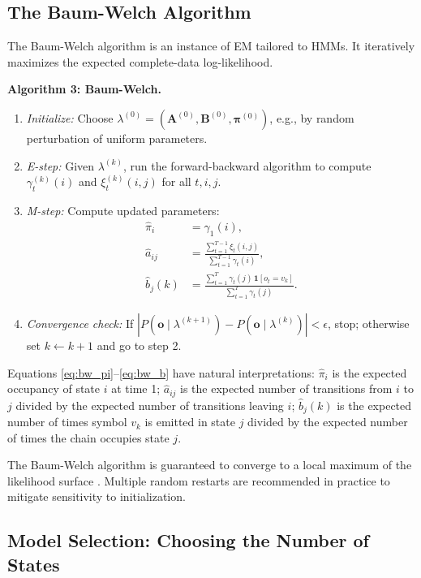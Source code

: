 \documentclass[conference]{IEEEtran}
\begin{document}
\subsection{The Baum-Welch Algorithm}

The Baum-Welch algorithm \cite{baum1970maximization} is an instance of EM tailored to HMMs. It iteratively maximizes the expected complete-data log-likelihood.

\textbf{Algorithm 3: Baum-Welch.}
\begin{enumerate}
  \item \textit{Initialize:} Choose $\lambda^{(0)} = (\mathbf{A}^{(0)}, \mathbf{B}^{(0)}, \boldsymbol{\pi}^{(0)})$, e.g., by random perturbation of uniform parameters.
  \item \textit{E-step:} Given $\lambda^{(k)}$, run the forward-backward algorithm to compute $\gamma_t^{(k)}(i)$ and $\xi_t^{(k)}(i,j)$ for all $t, i, j$.
  \item \textit{M-step:} Compute updated parameters:
  \begin{align}
  \hat{\pi}_i &= \gamma_1(i), \label{eq:bw_pi} \\
  \hat{a}_{ij} &= \frac{\sum_{t=1}^{T-1} \xi_t(i,j)}{\sum_{t=1}^{T-1} \gamma_t(i)}, \label{eq:bw_a} \\
  \hat{b}_j(k) &= \frac{\sum_{t=1}^{T} \gamma_t(j) \, \mathbf{1}[o_t = v_k]}{\sum_{t=1}^{T} \gamma_t(j)}. \label{eq:bw_b}
  \end{align}
  \item \textit{Convergence check:} If $|P(\mathbf{o} \mid \lambda^{(k+1)}) - P(\mathbf{o} \mid \lambda^{(k)})| < \epsilon$, stop; otherwise set $k \leftarrow k+1$ and go to step 2.
\end{enumerate}

Equations \eqref{eq:bw_pi}--\eqref{eq:bw_b} have natural interpretations: $\hat{\pi}_i$ is the expected occupancy of state $i$ at time 1; $\hat{a}_{ij}$ is the expected number of transitions from $i$ to $j$ divided by the expected number of transitions leaving $i$; $\hat{b}_j(k)$ is the expected number of times symbol $v_k$ is emitted in state $j$ divided by the expected number of times the chain occupies state $j$.

The Baum-Welch algorithm is guaranteed to converge to a local maximum of the likelihood surface \cite{dempster1977maximum}. Multiple random restarts are recommended in practice to mitigate sensitivity to initialization.

\subsection{Model Selection: Choosing the Number of States}
\end{document}
